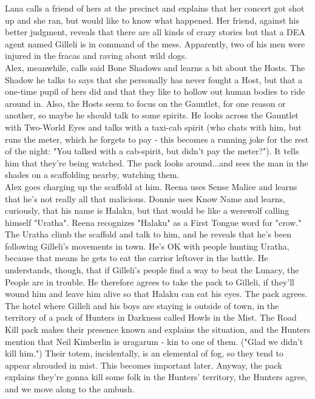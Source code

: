 \documentclass[oneside,12pt]{book}
\begin{document}
\begin{flushleft}
Lana calls a friend of hers at the precinct and explains that her concert got shot up and she ran, but would like to know what happened. Her friend, against his better judgment, reveals that there are all kinds of crazy stories but that a DEA agent named Gilleli is in command of the mess. Apparently, two of his men were injured in the fracas and raving about wild dogs.\\



Alex, meanwhile, calls said Bone Shadows and learns a bit about the Hosts. The Shadow he talks to says that she personally has never fought a Host, but that a one-time pupil of hers did and that they like to hollow out human bodies to ride around in. Also, the Hosts seem to focus on the Gauntlet, for one reason or another, so maybe he should talk to some spirits. He looks across the Gauntlet with Two-World Eyes and talks with a taxi-cab spirit (who chats with him, but runs the meter, which he forgets to pay - this becomes a running joke for the rest of the night: "You talked with a cab-spirit, but didn't pay the meter?"). It tells him that they're being watched. The pack looks around...and sees the man in the shades on a scaffolding nearby, watching them.\\






Alex goes charging up the scaffold at him. Reena uses Sense Malice and learns that he's not really all that malicious. Donnie uses Know Name and learns, curiously, that his name is Halaku, but that would be like a werewolf calling himself "Uratha". Reena recognizes "Halaku" as a First Tongue word for "crow."\\


The Uratha climb the scaffold and talk to him, and he reveals that he's been following Gilleli's movements in town. He's OK with people hunting Uratha, because that means he gets to eat the carrior leftover in the battle. He understands, though, that if Gilleli's people find a way to beat the Lunacy, the People are in trouble. He therefore agrees to take the pack to Gilleli, if they'll wound him and leave him alive so that Halaku can eat his eyes. The pack agrees.\\



The hotel where Gilleli and his boys are staying is outside of town, in the territory of a pack of Hunters in Darkness called Howls in the Mist. The Road Kill pack makes their presence known and explains the situation, and the Hunters mention that Neil Kimberlin is uragarum - kin to one of them. ("Glad we didn't kill him.") Their totem, incidentally, is an elemental of fog, so they tend to appear shrouded in mist. This becomes important later. Anyway, the pack explains they're gonna kill some folk in the Hunters' territory, the Hunters agree, and we move along to the ambush.\\





\end{flushleft}
\end{document}
